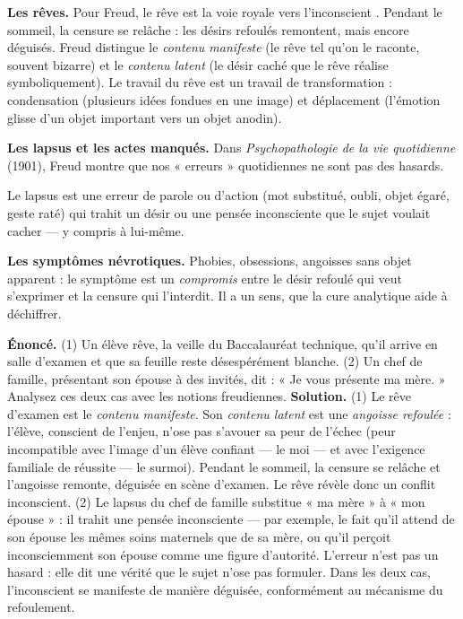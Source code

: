 \documentclass[11pt]{article}
\newcommand{\cle}[1]{{\popxbold\color{popdark}#1}}
\newcounter{popsec}
\newcounter{popsub}
\newcommand{\courssub}[1]{%
  \stepcounter{popsub}%
  \par\vspace{9pt}\noindent{\popxbold\fontsize{11.5}{13}\selectfont\color{popink}{\color{poporange}\thepopsec.\thepopsub}\hspace{6pt}#1}\par\nopagebreak\vspace{4pt}
}
\begin{document}
\courssub{Les manifestations de l'inconscient}

\textbf{Les rêves.} Pour Freud, le rêve est \og la voie royale vers l'inconscient \fg{}. Pendant le sommeil, la censure se relâche : les désirs refoulés remontent, mais encore déguisés. Freud distingue le \emph{contenu manifeste} (le rêve tel qu'on le raconte, souvent bizarre) et le \emph{contenu latent} (le désir caché que le rêve réalise symboliquement). Le travail du rêve est un travail de transformation : condensation (plusieurs idées fondues en une image) et déplacement (l'émotion glisse d'un objet important vers un objet anodin).

\textbf{Les lapsus et les actes manqués.} Dans \emph{Psychopathologie de la vie quotidienne} (1901), Freud montre que nos « erreurs » quotidiennes ne sont pas des hasards.

\begin{definition}[Le lapsus]
Le \cle{lapsus} est une erreur de parole ou d'action (mot substitué, oubli, objet égaré, geste raté) qui trahit un désir ou une pensée inconsciente que le sujet voulait cacher — y compris à lui-même.
\end{definition}

\textbf{Les symptômes névrotiques.} Phobies, obsessions, angoisses sans objet apparent : le symptôme est un \emph{compromis} entre le désir refoulé qui veut s'exprimer et la censure qui l'interdit. Il a un sens, que la cure analytique aide à déchiffrer.

\begin{exoresolu}
\textbf{Énoncé.} (1) Un élève rêve, la veille du Baccalauréat technique, qu'il arrive en salle d'examen et que sa feuille reste désespérément blanche. (2) Un chef de famille, présentant son épouse à des invités, dit : « Je vous présente ma mère. » Analysez ces deux cas avec les notions freudiennes.
\tcblower
\textbf{Solution.} (1) Le rêve d'examen est le \emph{contenu manifeste}. Son \emph{contenu latent} est une \emph{angoisse refoulée} : l'élève, conscient de l'enjeu, n'ose pas s'avouer sa peur de l'échec (peur incompatible avec l'image d'un élève confiant — le moi — et avec l'exigence familiale de réussite — le surmoi). Pendant le sommeil, la censure se relâche et l'angoisse remonte, déguisée en scène d'examen. Le rêve révèle donc un conflit inconscient. (2) Le lapsus du chef de famille substitue « ma mère » à « mon épouse » : il trahit une pensée inconsciente — par exemple, le fait qu'il attend de son épouse les mêmes soins maternels que de sa mère, ou qu'il perçoit inconsciemment son épouse comme une figure d'autorité. L'erreur n'est pas un hasard : elle dit une vérité que le sujet n'ose pas formuler. Dans les deux cas, l'inconscient se manifeste de manière déguisée, conformément au mécanisme du refoulement.
\end{exoresolu}
\end{document}
